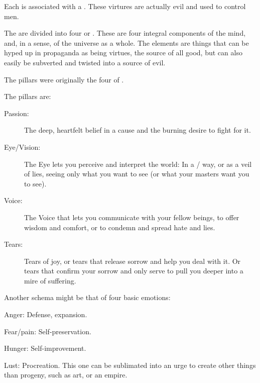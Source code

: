 Each \Sephirah{} is associated with a . 
These virtures are actually evil and used to control men. 


The \Sephiroth{} are divided into four  or . 
These are four integral components of the mind, and, in a sense, of the universe as a whole. 
The elements are things that can be hyped up in propaganda as being virtues, the source of all good, but can also easily be subverted and twisted into a source of evil. 

The pillars were originally the four  of \Kezerad. 

The pillars are: 

\begin{description}
  \item[Passion:] 
    The deep, heartfelt belief in a cause and the burning desire to fight for it. 
  \item[Eye/Vision:] 
    The Eye lets you perceive and interpret the world: In a / way, or as a veil of lies, seeing only what you want to see (or what your masters want you to see).
  \item[Voice:] 
    The Voice that lets you communicate with your fellow beings, to offer wisdom and comfort, or to condemn and spread hate and lies. 
  \item[Tears:] 
    Tears of joy, or tears that release sorrow and help you deal with it. Or tears that confirm your sorrow and only serve to pull you deeper into a mire of suffering. 
\end{description}

Another schema might be that of four basic emotions:

\begin{description}
  \item{Anger:} Defense, expansion.
  \item{Fear/pain:} Self-preservation.
  \item{Hunger:} Self-improvement.
  \item{Lust:} Procreation. This one can be sublimated into an urge to create other things than progeny, such as art, or an empire.
\end{description}








